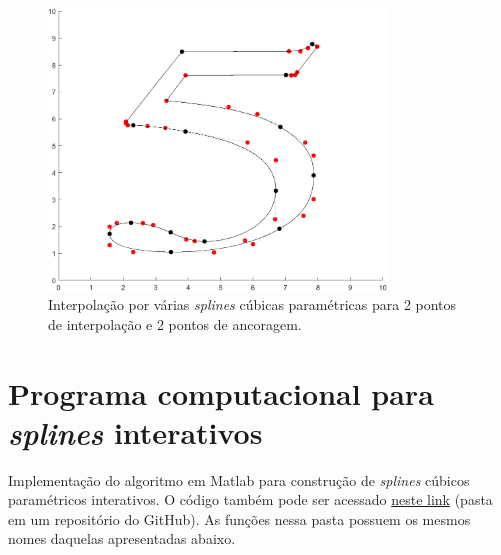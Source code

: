 \documentclass{article}
\begin{document}
\begin{enumerate}
\begin{enumerate}
                    \begin{figure}[!h]
                        \centering
                        \includegraphics[width=0.8\textwidth]{5.png}
                        \caption{Interpolação por várias \textit{splines} cúbicas paramétricas
                        para 2 pontos de interpolação e 2 pontos de ancoragem.}
                        \label{fig:5}
                    \end{figure}
                                        
            \end{enumerate}

    \end{enumerate}

    \clearpage

    \appendix

    \section{Programa computacional para \textit{splines} interativos}
        \label{appendix:splines}

        Implementação do algoritmo em Matlab
        para construção de \textit{splines} cúbicos paramétricos
        interativos. O código também pode ser acessado
        \href{https://github.com/lucasresck/introduction-to-numerical-analysis/tree/master/list_3}{neste link} (pasta em um repositório do GitHub).
        As funções nessa pasta possuem os mesmos nomes daquelas apresentadas abaixo.
\end{document}
